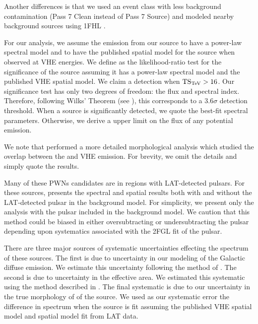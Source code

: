 Another differences is that we used an event class with less
background contamination (Pass 7 Clean instead of Pass 7
Source) and modeled nearby background sources using \ac{1FHL}
\citep{ackermann_2013a_first-fermi-lat}.

For our analysis, we assume the \gev emission from our source to have
a power-law spectral model and to have the published spatial model for
the source when observed at \ac{VHE} energies.  We define \tstev as the
likelihood-ratio test for the significance of the source assuming it has
a power-law spectral model and the published \ac{VHE} spatial model.
We claim a detection when $\mathrm{TS}_\text{TeV} > 16$.  Our significance test has
only two degrees of freedom: the flux and spectral index.  Therefore,
following Wilks' Theorem (see ),
this corresponds to a $3.6\sigma$ detection threshold. When a source
is significantly detected, we quote the best-fit spectral parameters.
Otherwise, we derive a upper limit on the flux of any potential emission.

We note that \cite{acero_2013a_constraints-galactic} performed a more
detailed morphological analysis which studied the overlap between the
\gev and \ac{VHE} emission. For brevity, we omit the details and simply
quote the results.

Many of these \acp{PWN} candidates are in regions with \ac{LAT}-detected
pulsars.  For these sources, \cite{acero_2013a_constraints-galactic}
presents the spectral and spatial results both with and without the
\ac{LAT}-detected pulsar in the background model. For simplicity,
we present only the analysis with the pulsar included in the
background model. We caution that this method could be biased in either
oversubtracting or undersubtracting the pulsar depending upon systematics
associated with the \ac{2FGL} fit of the pulsar.

There are three major sources of systematic uncertainties
effecting the spectrum of these sources. The first 
is due to uncertainty in our modeling of the Galactic diffuse
emission.  We estimate this uncertainty following the method of
.  The second is due
to uncertainty in the effective area.  We estimated this systematic
using the method described in \cite{ackermann_2012a_fermi-large}.
The final systematic is due to our uncertainty in the true morphology of
of the source. We used as our systematic error the difference
in spectrum when the source is fit assuming the published \ac{VHE}
spatial model and spatial model fit from \ac{LAT} data.

